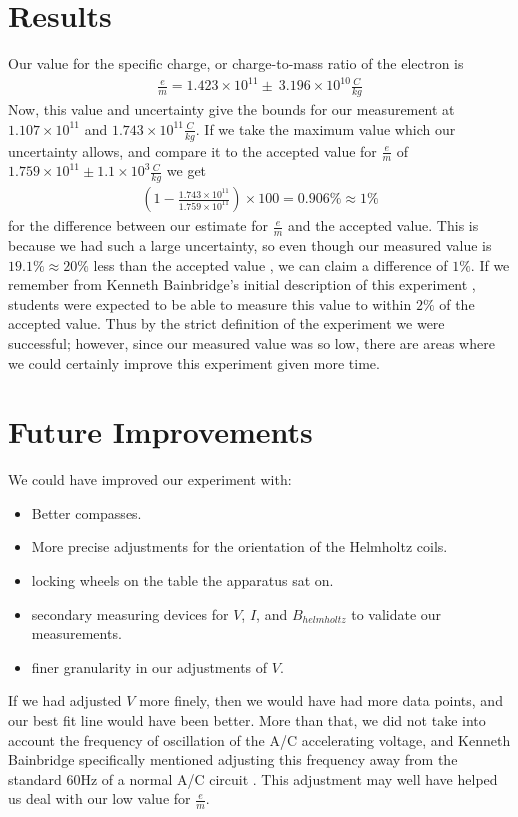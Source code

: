 \documentclass[aps,twocolumn,secnumarabic,amsmath,amssymb,nofootinbib]{revtex4-1}
\begin{document}
\section{Results}

Our value for the specific charge, or charge-to-mass ratio of the electron is
\begin{align*}
	\frac{e}{m} = 1.423 \times 10^{11} \pm \ 3.196 \times 10^{10} \frac{C}{kg}
\end{align*}
Now, this value and uncertainty give the bounds for our measurement at $1.107 \times 10^{11}$ and $1.743 \times 10^{11} \frac{C}{kg}$. If we take the maximum value which our uncertainty allows, and compare it to the accepted value for $\frac{e}{m}$ of $1.759\times10^{11} \pm 1.1\times10^3 \frac{C}{kg}$ \cite{value} we get 
\begin{align*}
	\left(1 - \frac{1.743 \times 10^{11}}{1.759\times10^{11}}\right) \times 100 = 0.906\% \approx 1\%
\end{align*}
for the difference between our estimate for $\frac{e}{m}$ and the accepted value. This is because we had such a large uncertainty, so even though our measured value is $19.1\% \approx 20\%$ less than the accepted value \cite{value}, we can claim a difference of $1\%$. If we remember from Kenneth Bainbridge's initial description of this experiment \cite{origin}, students were expected to be able to measure this value to within $2\%$ of the accepted value. Thus by the strict definition of the experiment we were successful; however, since our measured value was so low, there are areas where we could certainly improve this experiment given more time.


\section{Future Improvements}

We could have improved our experiment with:
\begin{itemize}[label={-}, noitemsep]
	\item Better compasses.
	\item More precise adjustments for the orientation of the Helmholtz coils.
	\item locking wheels on the table the apparatus sat on.
	\item secondary measuring devices for $V$, $I$, and $B_{helmholtz}$ to validate our measurements.
	\item finer granularity in our adjustments of $V$.
\end{itemize}
If we had adjusted $V$ more finely, then we would have had more data points, and our best fit line would have been better. More than that, we did not take into account the frequency of oscillation of the A/C accelerating voltage, and Kenneth Bainbridge specifically mentioned adjusting this frequency away from the standard 60Hz of a normal A/C circuit \cite{origin}. This adjustment may well have helped us deal with our low value for $\frac{e}{m}$. 
\end{document}
